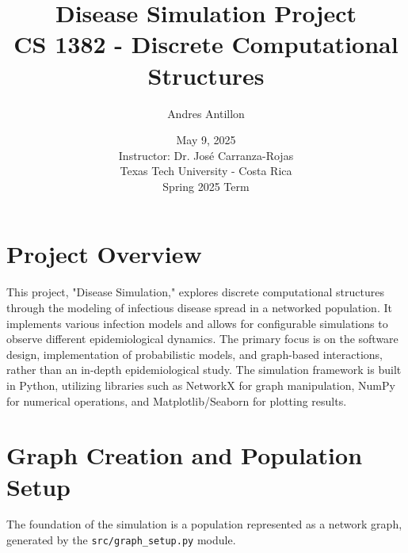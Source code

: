 \documentclass[12pt]{article}
\title{Disease Simulation Project \\ \large CS 1382 - Discrete Computational Structures}
\author{Andres Antillon}
\date{May 9, 2025 \\ \vspace{0.5em} \small Instructor: Dr. Jos\'{e} Carranza-Rojas \\ \small Texas Tech University - Costa Rica \\ \small Spring 2025 Term}
\begin{document}
\maketitle
\vspace{-2\baselineskip} %
\tableofcontents
\newpage

\section{Project Overview}
This project, "Disease Simulation," explores discrete computational structures through the modeling of infectious disease spread in a networked population. It implements various infection models and allows for configurable simulations to observe different epidemiological dynamics. The primary focus is on the software design, implementation of probabilistic models, and graph-based interactions, rather than an in-depth epidemiological study. The simulation framework is built in Python, utilizing libraries such as NetworkX for graph manipulation, NumPy for numerical operations, and Matplotlib/Seaborn for plotting results.

\section{Graph Creation and Population Setup}
The foundation of the simulation is a population represented as a network graph, generated by the \texttt{src/graph\_setup.py} module.
\end{document}
